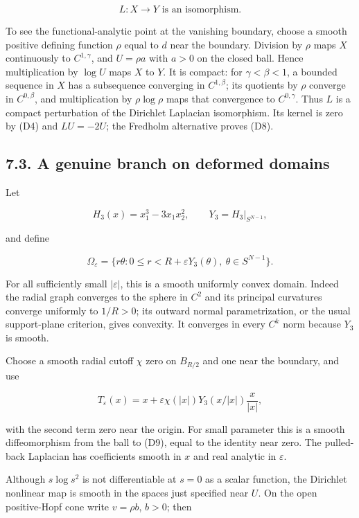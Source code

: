 \documentclass[11pt]{article}
\begin{document}
\[L:X\longrightarrow Y\text{ is an isomorphism}. \tag{D8}\]

To see the functional-analytic point at the vanishing boundary, choose a
smooth positive defining function \(\rho\) equal to \(d\) near the
boundary. Division by \(\rho\) maps \(X\) continuously to
\(C^{1,\gamma}\), and \(U=\rho a\) with \(a>0\) on the closed ball.
Hence multiplication by \(\log U\) maps \(X\) to \(Y\). It is compact:
for \(\gamma<\beta<1\), a bounded sequence in \(X\) has a subsequence
converging in \(C^{1,\beta}\); its quotients by \(\rho\) converge in
\(C^{0,\beta}\), and multiplication by \(\rho\log\rho\) maps that
convergence to \(C^{0,\gamma}\). Thus \(L\) is a compact perturbation of
the Dirichlet Laplacian isomorphism. Its kernel is zero by (D4) and
\(LU=-2U\); the Fredholm alternative proves (D8).

\subsection{7.3. A genuine branch on deformed
domains}\label{a-genuine-branch-on-deformed-domains}

Let

\[H_3(x)=x_1^3-3x_1x_2^2,\qquad Y_3=H_3|_{S^{N-1}},\]

and define

\[\Omega_\varepsilon
 =\{r\theta:0\leq r<R+\varepsilon Y_3(\theta),\ \theta\in S^{N-1}\}.
 \tag{D9}\]

For all sufficiently small \(|\varepsilon|\), this is a smooth uniformly
convex domain. Indeed the radial graph converges to the sphere in
\(C^2\) and its principal curvatures converge uniformly to \(1/R>0\);
its outward normal parametrization, or the usual support-plane
criterion, gives convexity. It converges in every \(C^k\) norm because
\(Y_3\) is smooth.

Choose a smooth radial cutoff \(\chi\) zero on \(B_{R/2}\) and one near
the boundary, and use

\[T_\varepsilon(x)=x+\varepsilon\chi(|x|)Y_3(x/|x|)\frac{x}{|x|},
 \tag{D10}\]

with the second term zero near the origin. For small parameter this is a
smooth diffeomorphism from the ball to (D9), equal to the identity near
zero. The pulled-back Laplacian has coefficients smooth in \(x\) and
real analytic in \(\varepsilon\).

Although \(s\log s^2\) is not differentiable at \(s=0\) as a scalar
function, the Dirichlet nonlinear map is smooth in the spaces just
specified near \(U\). On the open positive-Hopf cone write \(v=\rho b\),
\(b>0\); then
\end{document}
